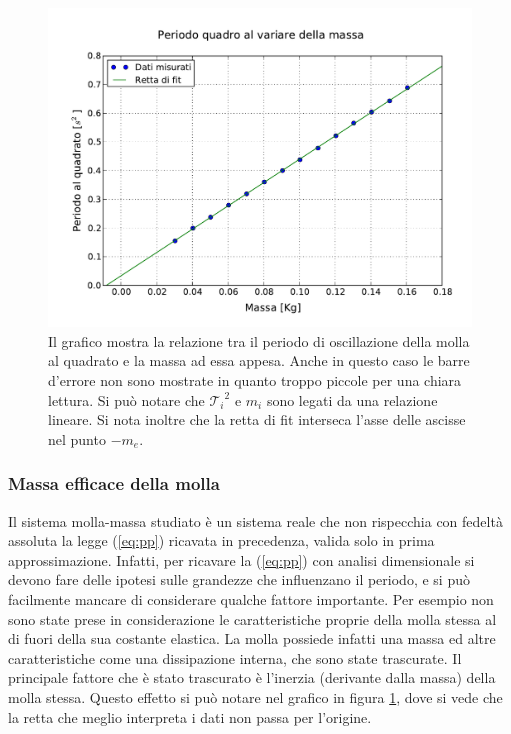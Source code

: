 \begin{figure}
    \centering
    \includegraphics[width=120mm]{immagini/periodo2_massa.pdf}
    \caption{Il grafico mostra la relazione tra il periodo di oscillazione della molla al quadrato e la massa ad essa appesa.
        Anche in questo caso le barre d'errore non sono mostrate in quanto troppo piccole per una chiara lettura.
        Si può notare che ${\mathcal{T}_i}^2$ e $m_i$ sono legati da una relazione lineare. Si nota inoltre che la retta di fit
        interseca l'asse delle ascisse nel punto $-m_e$.}
    \label{fig:periodo2_massa}
\end{figure}

\subsubsection{Massa efficace della molla}

Il sistema molla-massa studiato è un sistema reale che non rispecchia con fedeltà assoluta la legge (\ref{eq:pp}) ricavata in precedenza, valida solo in prima approssimazione. Infatti, per ricavare la (\ref{eq:pp}) con analisi dimensionale
si devono fare delle ipotesi sulle grandezze che influenzano il periodo, e si può facilmente mancare di considerare qualche
fattore importante. Per esempio non sono state prese in considerazione le caratteristiche proprie della molla stessa
al di fuori della sua costante elastica. La molla possiede infatti una massa ed altre caratteristiche
come una dissipazione interna, che sono state trascurate. Il principale fattore che è stato trascurato
è l'inerzia (derivante dalla massa) della molla stessa. Questo effetto si può notare nel grafico in figura \ref{fig:periodo2_massa},
dove si vede che la retta che meglio interpreta i dati non passa per l'origine.

